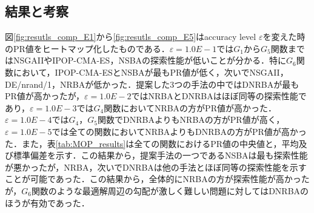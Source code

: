 \documentclass[a4j,11pt]{jarticle}
\begin{document}
\subsection{結果と考察}
\label{ss:results}
図\ref{fig:resutls_comp_E1}から\ref{fig:resutls_comp_E5}はaccuracy level $\varepsilon$を変えた時のPR値をヒートマップ化したものである．$\varepsilon = 1.0E-1$では$G_1$から$G_5$関数まではNSGAIIやIPOP-CMA-ES，NSBAの探索性能が低いことが分かる．特に$G_6$関数において，IPOP-CMA-ESとNSBAが最もPR値が低く，次いでNSGAII，DE/nrand/1，NRBAが低かった．提案した3つの手法の中ではDNRBAが最もPR値が高かったが，$\varepsilon = 1.0E-2$ではNRBAとDNRBAはほぼ同等の探索性能であり，$\varepsilon=1.0E-3$では$G_4$関数においてNRBAの方がPR値が高かった．$\varepsilon=1.0E-4$では$G_4$，$G_5$関数でDNRBAよりもNRBAの方がPR値が高く，$\varepsilon = 1.0E-5$では全ての関数においてNRBAよりもDNRBAの方がPR値が高かった．また，表\ref{tab:MOP_results}は全ての関数におけるPR値の中央値と，平均及び標準偏差を示す．この結果から，提案手法の一つであるNSBAは最も探索性能が悪かったが，NRBA，次いでDNRBAは他の手法とほぼ同等の探索性能を示すことが可能であった．この結果から，全体的にNRBAの方が探索性能が高かったが，$G_6$関数のような最適解周辺の勾配が激しく難しい問題に対してはDNRBAのほうが有効であった．
\end{document}

